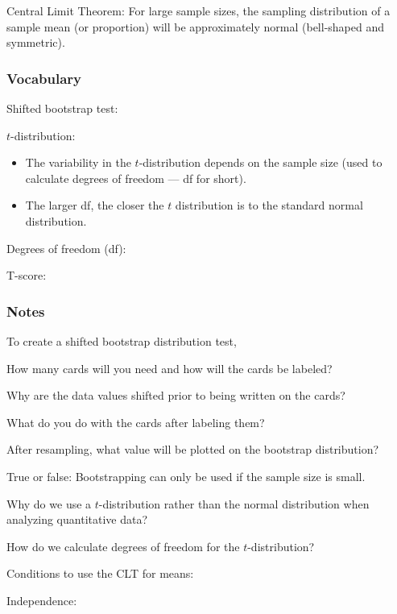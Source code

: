 \documentclass[
]{report}
\newcommand{\rgs}{\vspace{12pt}} %
\newcommand{\rgi}{\hspace{24pt}}  %
\begin{document}
Central Limit Theorem: For large sample sizes, the sampling distribution of a sample mean (or proportion) will be approximately normal (bell-shaped and symmetric).

\hypertarget{vocabulary-17}{%
\subsubsection*{Vocabulary}\label{vocabulary-17}}

Shifted bootstrap test:
\rgs

\(t\)-distribution:
\rgs 

\begin{itemize}
\item
  The variability in the \(t\)-distribution depends on the sample size (used to calculate degrees of freedom --- df for short).
\item
  The larger df, the closer the \(t\) distribution is to the standard normal distribution.
\end{itemize}

Degrees of freedom (df):
\rgs 

T-score:
\rgs 

\hypertarget{notes-22}{%
\subsubsection*{Notes}\label{notes-22}}

To create a shifted bootstrap distribution test,

\rgi How many cards will you need and how will the cards be labeled?
\rgs 

\rgi Why are the data values shifted prior to being written on the cards?
\rgs

\rgi What do you do with the cards after labeling them?
\rgs 

\rgi After resampling, what value will be plotted on the bootstrap distribution?
\rgs 

True or false: Bootstrapping can only be used if the sample size is small.
\rgs 

Why do we use a \(t\)-distribution rather than the normal distribution when analyzing quantitative data?
\rgs 

How do we calculate degrees of freedom for the \(t\)-distribution?
\rgs 

Conditions to use the CLT for means:

\rgi Independence:
\rgs 
\end{document}
